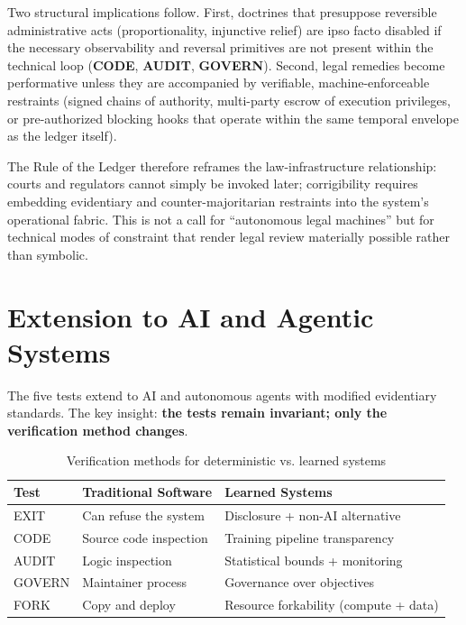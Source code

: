Two structural implications follow. First, doctrines that presuppose reversible administrative acts (proportionality, injunctive relief) are ipso facto disabled if the necessary observability and reversal primitives are not present within the technical loop (\textbf{CODE}, \textbf{AUDIT}, \textbf{GOVERN}). Second, legal remedies become performative unless they are accompanied by verifiable, machine-enforceable restraints (signed chains of authority, multi-party escrow of execution privileges, or pre-authorized blocking hooks that operate within the same temporal envelope as the ledger itself).

The Rule of the Ledger therefore reframes the law-infrastructure relationship: courts and regulators cannot simply be invoked later; corrigibility requires embedding evidentiary and counter-majoritarian restraints into the system's operational fabric. This is not a call for ``autonomous legal machines'' but for technical modes of constraint that render legal review materially possible rather than symbolic.

\section{Extension to AI and Agentic Systems}
\label{sec:learned}

The five tests extend to AI and autonomous agents with modified evidentiary standards. The key insight: \textbf{the tests remain invariant; only the verification method changes}.

\begin{table}[htbp]
\centering
\small
\begin{tabular}{@{}lll@{}}
\toprule
\textbf{Test} & \textbf{Traditional Software} & \textbf{Learned Systems} \\
\midrule
EXIT & Can refuse the system & Disclosure + non-AI alternative \\
CODE & Source code inspection & Training pipeline transparency \\
AUDIT & Logic inspection & Statistical bounds + monitoring \\
GOVERN & Maintainer process & Governance over objectives \\
FORK & Copy and deploy & Resource forkability (compute + data) \\
\bottomrule
\end{tabular}
\caption{Verification methods for deterministic vs. learned systems}
\end{table}

